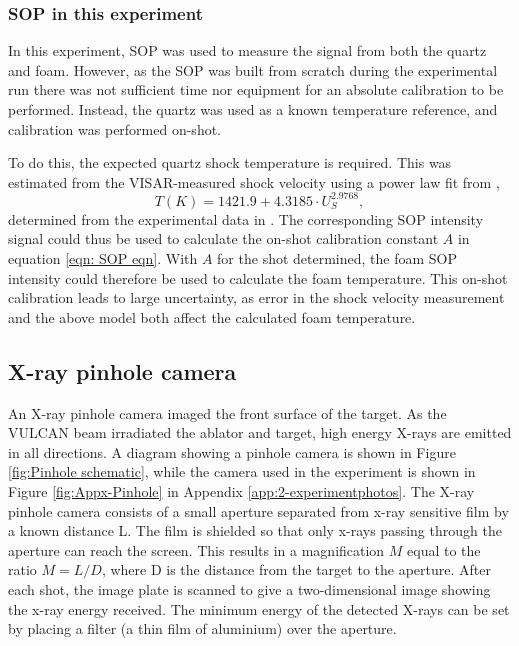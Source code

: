 \subsubsection{SOP in this experiment}

In this experiment, SOP was used to measure the signal from both the quartz and foam. However, as the SOP was built from scratch during the experimental run there was not sufficient time nor equipment for an absolute calibration to be performed. Instead, the quartz was used as a known temperature reference, and calibration was performed on-shot.

To do this, the expected quartz shock temperature is required. This was estimated from the VISAR-measured shock velocity using a power law fit from \cite{Millot2015}, \begin{equation} T(K) = 1421.9 + 4.3185 \cdot U_S^{2.9768}, \label{eqn:Temp fit} \end{equation} determined from the experimental data in \cite{Hicks2006}. The corresponding SOP intensity signal could thus be used to calculate the on-shot calibration constant $A$ in equation \ref{eqn: SOP eqn}. With $A$ for the shot determined, the foam SOP intensity could therefore be used to calculate the foam temperature. This on-shot calibration leads to large uncertainty, as error in the shock velocity measurement and the above model both affect the calculated foam temperature.

\subsection{X-ray pinhole camera}
An X-ray pinhole camera imaged the front surface of the target. As the VULCAN beam irradiated the ablator and target, high energy X-rays are emitted in all directions. A diagram showing a pinhole camera is shown in Figure \ref{fig:Pinhole schematic}, while the camera used in the experiment is shown in Figure \ref{fig:Appx-Pinhole} in Appendix \ref{app:2-experimentphotos}. The X-ray pinhole camera consists of a small aperture separated from x-ray sensitive film by a known distance L. The film is shielded so that only x-rays passing through the aperture can reach the screen. This results in a magnification $M$ equal to the ratio $M = L/D$, where D is the distance from the target to the aperture. After each shot, the image plate is scanned to give a two-dimensional image showing the x-ray energy received. The minimum energy of the detected X-rays can be set by placing a filter (a thin film of aluminium) over the aperture.

